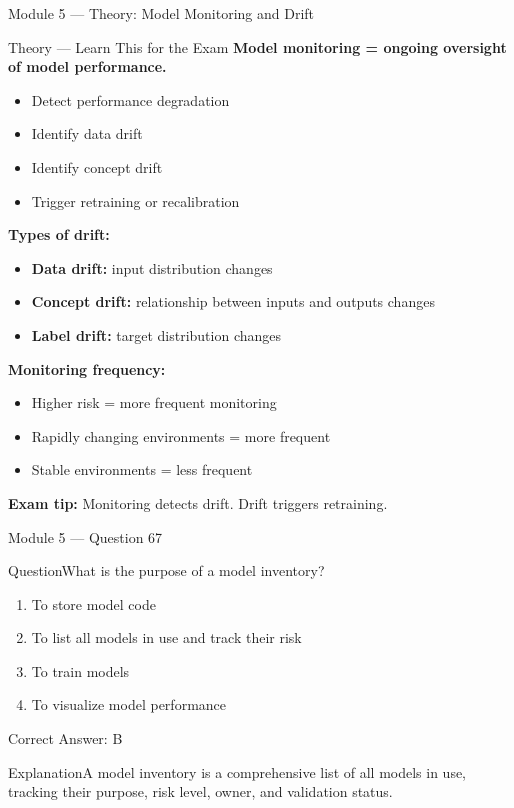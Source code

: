 \documentclass[aspectratio=169,10pt]{beamer}
\newcommand{\question}[1]{\begin{block}{Question}#1\end{block}}
\newcommand{\options}[4]{%
	\begin{enumerate}[label=\Alph*.,leftmargin=*]
		\item #1
		\item #2
		\item #3
		\item #4
	\end{enumerate}
}
\newcommand{\answerbox}[1]{\begin{exampleblock}{Correct Answer: #1}\end{exampleblock}}
\newcommand{\explain}[1]{\begin{block}{Explanation}#1\end{block}}
\newcommand{\theory}[1]{%
	\begin{block}{Theory --- Learn This for the Exam}
		\small #1
	\end{block}
}
\begin{document}
	\begin{frame}{Module 5 --- Theory: Model Monitoring and Drift}
		\theory{
			\textbf{Model monitoring = ongoing oversight of model performance.}
			\begin{itemize}
				\item Detect performance degradation
				\item Identify data drift
				\item Identify concept drift
				\item Trigger retraining or recalibration
			\end{itemize}
			\textbf{Types of drift:}
			\begin{itemize}
				\item \textbf{Data drift:} input distribution changes
				\item \textbf{Concept drift:} relationship between inputs and outputs changes
				\item \textbf{Label drift:} target distribution changes
			\end{itemize}
			\textbf{Monitoring frequency:}
			\begin{itemize}
				\item Higher risk = more frequent monitoring
				\item Rapidly changing environments = more frequent
				\item Stable environments = less frequent
			\end{itemize}
			\textbf{Exam tip:} Monitoring detects drift. Drift triggers retraining.
		}
	\end{frame}
	
	\begin{frame}{Module 5 --- Question 67}
		\question{What is the purpose of a model inventory?}
		\options{To store model code}{To list all models in use and track their risk}{To train models}{To visualize model performance}
		\answerbox{B}
		\explain{A model inventory is a comprehensive list of all models in use, tracking their purpose, risk level, owner, and validation status.}
	\end{frame}
	
\end{document}
